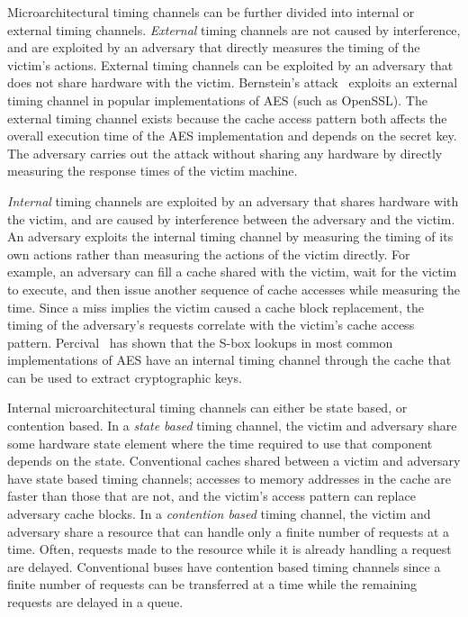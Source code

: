 Microarchitectural timing channels can be further divided into internal or 
external timing channels. \emph{External} timing channels are not caused by 
interference, and are exploited by an adversary that directly measures the 
timing of the victim's actions. External timing channels can be exploited by an 
adversary that does not share hardware with the victim. Bernstein's 
attack~\cite{bernstein} exploits an external timing channel in popular 
implementations of AES (such as OpenSSL). The external timing channel exists 
because the cache access pattern both affects the overall execution time of the 
AES implementation and depends on the secret key. The adversary carries out the 
attack without sharing any hardware by directly measuring the response times of 
the victim machine.

\emph{Internal} timing channels are exploited by an adversary that shares 
hardware with the victim, and are caused by interference between the adversary 
and the victim. An adversary exploits the internal timing channel by measuring 
the timing of its own actions rather than measuring the actions of the victim 
directly. For example, an adversary can fill a cache shared with the victim, 
wait for the victim to execute, and then issue another sequence of cache 
accesses while measuring the time. Since a miss implies the victim caused a 
cache block replacement, the timing of the adversary's requests correlate with 
the victim's cache access pattern. Percival~\cite{percival} has shown that the 
S-box lookups in most common implementations of AES have an internal timing 
channel through the cache that can be used to extract cryptographic keys. 

Internal microarchitectural timing channels can either be state based, or 
contention based. In a \emph{state based} timing channel, the victim and 
adversary share some hardware state element where the time required to use that 
component depends on the state. Conventional caches shared between a victim and 
adversary have state based timing channels; accesses to memory addresses in the 
cache are faster than those that are not, and the victim's access pattern can
replace adversary cache blocks. In a \emph{contention based} timing channel, 
the victim and adversary share a resource that can handle only a finite number 
of requests at a time. Often, requests made to the resource while it is already 
handling a request are delayed. Conventional buses have contention based timing 
channels since a finite number of requests can be transferred at a time while 
the remaining requests are delayed in a queue.

